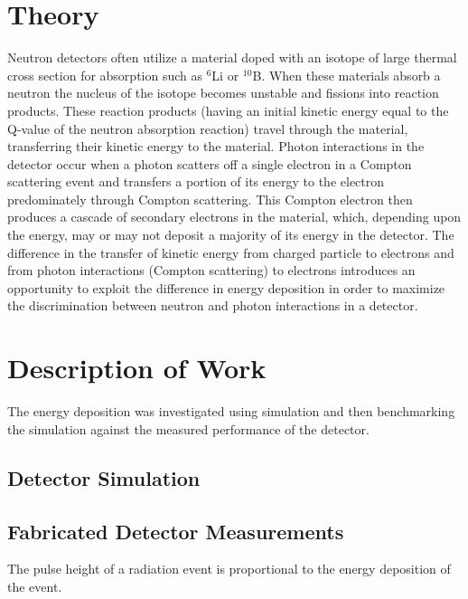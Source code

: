 \documentclass{anstrans}
\newcommand{\iso}[2]{${}^{#2}${#1}}
\begin{document}
\section{Theory}
Neutron detectors often utilize a material doped with an isotope of large thermal cross section for absorption such as \iso{Li}{6} or \iso{B}{10}. 
When these materials absorb a neutron the nucleus of the isotope becomes unstable and fissions into reaction products.
These reaction products (having an initial kinetic energy equal to the Q-value of the neutron absorption reaction) travel through the material, transferring their kinetic energy to the material.
Photon interactions in the detector occur when a photon scatters off a single electron in a Compton scattering event and transfers a portion of its energy to the electron predominately through Compton scattering.
This Compton electron then produces a cascade of secondary electrons in the material, which, depending upon the energy, may or may not deposit a majority of its energy in the detector.
The difference in the transfer of kinetic energy from charged particle to electrons and from photon interactions (Compton scattering) to electrons introduces an opportunity to exploit the difference in energy deposition in order to maximize the discrimination between neutron and photon interactions in a detector.

\section{Description of Work}
The energy deposition was investigated using simulation and then benchmarking the simulation against the measured performance of the detector.
\subsection{Detector Simulation}

\subsection{Fabricated Detector Measurements}
The pulse height of a radiation event is proportional to the energy deposition of the event\cite{birks_scintillations_1951}.
\end{document}
